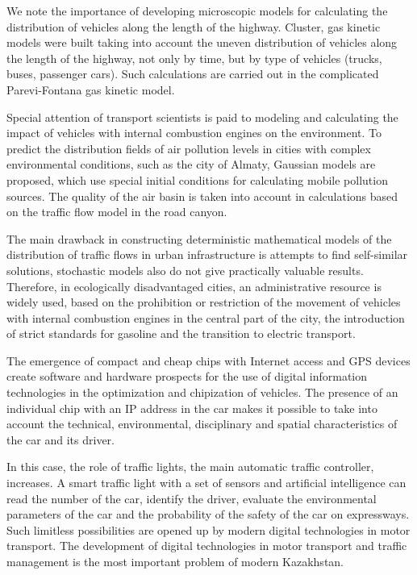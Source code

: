 We note the importance of developing microscopic models for calculating
the distribution of vehicles along the length of the highway. Cluster,
gas kinetic models were built taking into account the uneven
distribution of vehicles along the length of the highway, not only by
time, but by type of vehicles (trucks, buses, passenger cars). Such
calculations are carried out in the complicated Parevi-Fontana gas
kinetic model.

Special attention of transport scientists is paid to modeling and
calculating the impact of vehicles with internal combustion engines on
the environment. To predict the distribution fields of air pollution
levels in cities with complex environmental conditions, such as the city
of Almaty, Gaussian models are proposed, which use special initial
conditions for calculating mobile pollution sources. The quality of the
air basin is taken into account in calculations based on the traffic
flow model in the road canyon.

The main drawback in constructing deterministic mathematical models of
the distribution of traffic flows in urban infrastructure is attempts to
find self-similar solutions, stochastic models also do not give
practically valuable results. Therefore, in ecologically disadvantaged
cities, an administrative resource is widely used, based on the
prohibition or restriction of the movement of vehicles with internal
combustion engines in the central part of the city, the introduction of
strict standards for gasoline and the transition to electric transport.

The emergence of compact and cheap chips with Internet access and GPS
devices create software and hardware prospects for the use of digital
information technologies in the optimization and chipization of
vehicles. The presence of an individual chip with an IP address in the
car makes it possible to take into account the technical, environmental,
disciplinary and spatial characteristics of the car and its driver.

In this case, the role of traffic lights, the main automatic traffic
controller, increases. A smart traffic light with a set of sensors and
artificial intelligence can read the number of the car, identify the
driver, evaluate the environmental parameters of the car and the
probability of the safety of the car on expressways. Such limitless
possibilities are opened up by modern digital technologies in motor
transport. The development of digital technologies in motor transport
and traffic management is the most important problem of modern
Kazakhstan.

